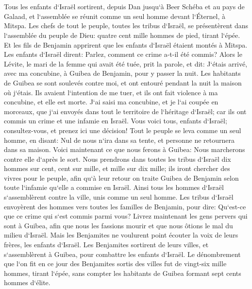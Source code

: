 \chapter{}

\verse Tous les enfants d`Israël sortirent, depuis Dan jusqu`à Beer Schéba et au pays de Galaad, et l`assemblée se réunit comme un seul homme devant l`Éternel, à Mitspa. 
\verse Les chefs de tout le peuple, toutes les tribus d`Israël, se présentèrent dans l`assemblée du peuple de Dieu: quatre cent mille hommes de pied, tirant l`épée. 
\verse Et les fils de Benjamin apprirent que les enfants d`Israël étaient montés à Mitspa. Les enfants d`Israël dirent: Parlez, comment ce crime a-t-il été commis? 
\verse Alors le Lévite, le mari de la femme qui avait été tuée, prit la parole, et dit: J`étais arrivé, avec ma concubine, à Guibea de Benjamin, pour y passer la nuit. 
\verse Les habitants de Guibea se sont soulevés contre moi, et ont entouré pendant la nuit la maison où j`étais. Ils avaient l`intention de me tuer, et ils ont fait violence à ma concubine, et elle est morte. 
\verse J`ai saisi ma concubine, et je l`ai coupée en morceaux, que j`ai envoyés dans tout le territoire de l`héritage d`Israël; car ils ont commis un crime et une infamie en Israël. 
\verse Vous voici tous, enfants d`Israël; consultez-vous, et prenez ici une décision! 
\verse Tout le peuple se leva comme un seul homme, en disant: Nul de nous n`ira dans sa tente, et personne ne retournera dans sa maison. 
\verse Voici maintenant ce que nous ferons à Guibea: Nous marcherons contre elle d`après le sort. 
\verse Nous prendrons dans toutes les tribus d`Israël dix hommes sur cent, cent sur mille, et mille sur dix mille; ils iront chercher des vivres pour le peuple, afin qu`à leur retour on traite Guibea de Benjamin selon toute l`infamie qu`elle a commise en Israël. 
\verse Ainsi tous les hommes d`Israël s`assemblèrent contre la ville, unis comme un seul homme. 
\verse Les tribus d`Israël envoyèrent des hommes vers toutes les familles de Benjamin, pour dire: Qu`est-ce que ce crime qui s`est commis parmi vous? 
\verse Livrez maintenant les gens pervers qui sont à Guibea, afin que nous les fassions mourir et que nous ôtions le mal du milieu d`Israël. Mais les Benjamites ne voulurent point écouter la voix de leurs frères, les enfants d`Israël. 
\verse Les Benjamites sortirent de leurs villes, et s`assemblèrent à Guibea, pour combattre les enfants d`Israël. 
\verse Le dénombrement que l`on fit en ce jour des Benjamites sortis des villes fut de vingt-six mille hommes, tirant l`épée, sans compter les habitants de Guibea formant sept cents hommes d`élite. 
